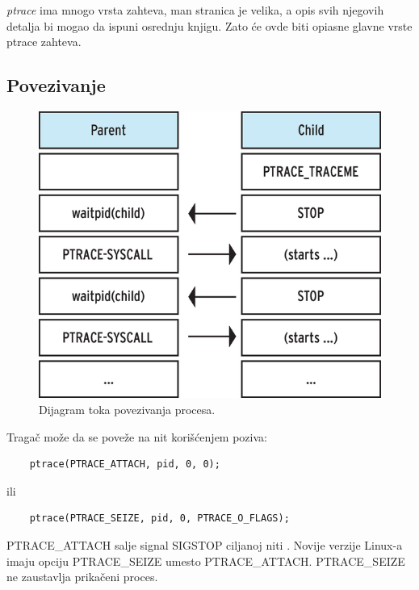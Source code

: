 \documentclass[a4paper]{article}
\begin{document}
\emph{ptrace} ima mnogo vrsta zahteva, man stranica je velika, a opis svih njegovih detalja bi mogao da ispuni osrednju knjigu.
Zato će ovde biti opiasne glavne vrste ptrace zahteva. 

\subsection{Povezivanje}	

\label{sec:pov}
\begin{figure}[h!]
    \begin{center}
    \includegraphics[scale=1.1]{img/diag.png}
    \end{center}
    \caption{Dijagram toka povezivanja procesa.}
    \label{fig:diag}
\end{figure}

Tragač može da se poveže na nit korišćenjem poziva:

\begin{verbatim}
    ptrace(PTRACE_ATTACH, pid, 0, 0);
\end{verbatim}
ili
\begin{verbatim}
    ptrace(PTRACE_SEIZE, pid, 0, PTRACE_O_FLAGS);
\end{verbatim}

PTRACE\_ATTACH salje signal SIGSTOP ciljanoj niti \cite{man}. 
Novije verzije Linux-a imaju opciju PTRACE\_SEIZE umesto 
PTRACE\_ATTACH. PTRACE\_SEIZE ne zaustavlja prikačeni proces.
\end{document}
